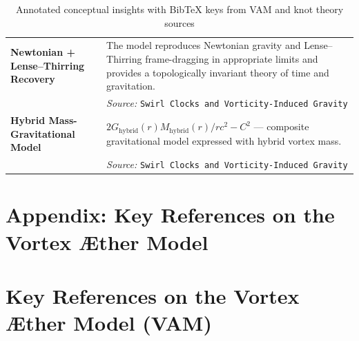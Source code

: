 \documentclass[11pt]{article}
\begin{document}
\begin{table}[H]
\begin{tabular}{|p{4.3cm}|p{9.5cm}|}
\textbf{Newtonian + Lense–Thirring Recovery} &
The model reproduces Newtonian gravity and Lense–Thirring frame-dragging in appropriate limits and provides a topologically invariant theory of time and gravitation.\\
& \textit{Source:} \texttt{Swirl Clocks and Vorticity-Induced Gravity}\\
\hline

\textbf{Hybrid Mass-Gravitational Model} &
$2G_\text{hybrid}(r) M_\text{hybrid}(r)/r c^2 - C^2$ — composite gravitational model expressed with hybrid vortex mass.\\
& \textit{Source:} \texttt{Swirl Clocks and Vorticity-Induced Gravity}\\
\hline
\end{tabular}
\caption{Annotated conceptual insights with BibTeX keys from VAM and knot theory sources}
\label{tab:annotated_refs}
\end{table}
    \newcommand{\appendixtitleII}{Appendix: Key References on the Vortex Æther Model}
\section{\appendixtitleII}
\section*{Key References on the Vortex Æther Model (VAM)}
\end{document}
